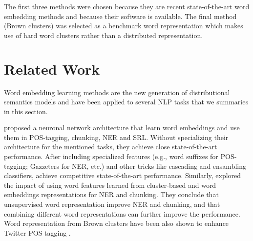 \documentclass[11pt]{article}
\begin{document}
The first three methods were chosen because they are recent
state-of-the-art word embedding methods and because their software is
available. The final method (Brown clusters) was selected as a benchmark
word representation which makes use of hard word clusters rather than
a distributed representation.


\section{Related Work}
Word embedding learning methods are the new generation of distributional semantics models and have been applied to several 
NLP tasks that we summaries in this section.

 proposed a neuronal network architecture
that learn word embeddings and use them in POS-tagging, chunking, NER and SRL. 
Without specializing their architecture for the mentioned tasks, they achieve close state-of-the-art performance. After including specialized features (e.g., word suffixes for POS-tagging;  Gazzeters for NER, etc.) and other tricks like cascading and ensambling classifiers, achieve competitive state-of-the-art performance.
Similarly,  explored the impact of using word
features learned from cluster-based and word embeddings representations
for NER and chunking. 
They conclude that unsupervised word representation improve NER and chunking, and that combining different word representations can further improve the performance.
Word representation from Brown clusters have been also shown to enhance
Twitter POS tagging .  
\end{document}
